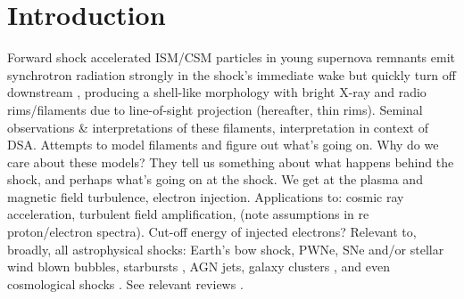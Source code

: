 \documentclass[iop, apj, numberedappendix, twocolappendix]{emulateapj}
\begin{document}

\section{Introduction}


Forward shock accelerated ISM/CSM particles in young supernova remnants emit
synchrotron radiation strongly in the shock's immediate wake but quickly turn
off downstream \citep{koyama1995, reynolds1996}, producing a shell-like
morphology with bright X-ray and radio rims/filaments due to line-of-sight
projection (hereafter, thin rims).
Seminal observations \& interpretations of these filaments, interpretation in
context of DSA.  Attempts to model filaments and figure out what's going on.
Why do we care about these models?  They tell us something about what happens
behind the shock, and perhaps what's going on at the shock.  We get at the
plasma and magnetic field turbulence, electron injection.
Applications to: cosmic ray acceleration, turbulent field amplification, (note
assumptions in re proton/electron spectra).
Cut-off energy of injected electrons?
Relevant to, broadly, all astrophysical shocks: Earth's bow shock,
PWNe, SNe and/or stellar wind blown bubbles, starbursts \citep{heckman1990},
AGN jets, galaxy clusters \citep{van-weeren2010}, and even cosmological shocks
\citep{miniati2000, ryu2008}.  See relevant reviews \citep{blandford1987}.
\end{document}
